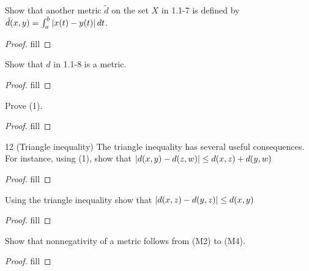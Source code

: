 \begin{exercise}{8}
Show that another metric $\tilde{d}$ on the set $X$ in 1.1-7 is defined by $\tilde{d}(x,y)=\int_a^b\left\lvert x(t)-y(t)\right\rvert dt$.
\end{exercise}
\begin{proof}
fill
\end{proof}

\begin{exercise}{9}
Show that $d$ in 1.1-8 is a metric.
\end{exercise}
\begin{proof}
fill
\end{proof}

\begin{exercise}{11}
Prove (1).
\end{exercise}
\begin{proof}
fill
\end{proof}

\begin{exercise}{12 (Triangle inequality)}
The triangle inequality has several useful consequences. For instance, using (1), show that $\left\lvert d(x,y)-d(z,w)\right\rvert\leq d(x,z)+d(y,w)$
\end{exercise}
\begin{proof}
fill
\end{proof}

\begin{exercise}{13}
Using the triangle inequality show that $\left\lvert d(x,z)-d(y,z)\right\rvert\leq d(x,y)$
\end{exercise}
\begin{proof}
fill
\end{proof}

\begin{exercise}{15}
Show that nonnegativity of a metric follows from (M2) to (M4).
\end{exercise}
\begin{proof}
fill
\end{proof}
